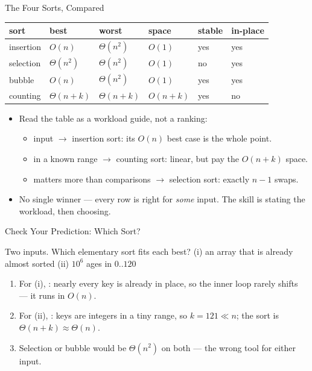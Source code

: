 \documentclass[aspectratio=169]{beamer}
\begin{document}
\begin{frame}{The Four Sorts, Compared}
  \begin{center}
  {\footnotesize
  \begin{tabular}{llllll}
    \toprule
    \textbf{sort} & \textbf{best} & \textbf{worst} & \textbf{space} &
      \textbf{stable} & \textbf{in-place} \\
    \midrule
    insertion & $O(n)$ & $\Theta(n^2)$ & $O(1)$ & yes & yes \\
    selection & $\Theta(n^2)$ & $\Theta(n^2)$ & $O(1)$ & no & yes \\
    bubble & $O(n)$ & $\Theta(n^2)$ & $O(1)$ & yes & yes \\
    counting & $\Theta(n+k)$ & $\Theta(n+k)$ & $O(n+k)$ & yes & no \\
    \bottomrule
  \end{tabular}}
  \end{center}
  \begin{itemize}
    \item Read the table as a workload guide, not a ranking:
      \begin{itemize}
        \item {} input $\to$ insertion sort: its $O(n)$ best
          case is the whole point.
        \item {} in a known range $\to$ counting sort:
          linear, but pay the $O(n+k)$ space.
        \item {} matters more than comparisons $\to$
          selection sort: exactly $n-1$ swaps.
      \end{itemize}
    \item No single winner --- every row is right for \emph{some} input. The
      skill is stating the workload, then choosing.
  \end{itemize}
\end{frame}

\begin{frame}{Check Your Prediction: Which Sort?}
  \begin{block}{Two inputs. Which elementary sort fits each best? \quad
    (i) an array that is already almost sorted \quad (ii) $10^6$ ages in
    $0..120$}
  \end{block}
  \begin{enumerate}
    \item For (i), : nearly every key is already in
      place, so the inner loop rarely shifts --- it runs in $O(n)$.
    \item For (ii), : keys are integers in a tiny range,
      so $k = 121 \ll n$; the sort is $\Theta(n + k) \approx \Theta(n)$.
    \item Selection or bubble would be $\Theta(n^2)$ on both --- the wrong
      tool for either input.
  \end{enumerate}
\end{frame}
\end{document}
